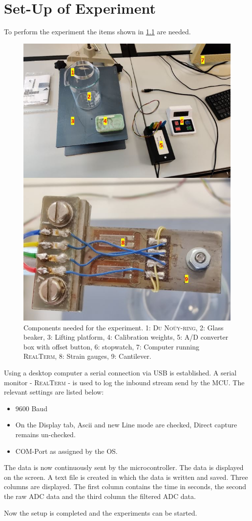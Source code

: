 \chapter{Set-Up of Experiment}
To perform the experiment the items shown in \cref{fig:setup} are needed.
 \begin{figure}[H]
	\centering
	\includegraphics[width=.7\textwidth]{aufbau/Setup/setup_num}
	\caption[Components needed for the experiment]{Components needed for the experiment. 1: \textsc{Du Noüy-ring}, 2: Glass beaker, 3: Lifting platform, 4: Calibration weights, 5: A/D converter box with offset button, 6: stopwatch, 7: Computer running \textsc{RealTerm}, 8: Strain gauges, 9: Cantilever.}
	\label{fig:setup}
\end{figure}

Using a desktop computer a serial connection via USB is established. A serial monitor - \textsc{RealTerm} - is used to log the inbound stream send by the MCU. The relevant settings are listed below:
\begin{itemize}
	\item 9600 Baud
	\item On the Display tab, Ascii and new Line mode are checked, Direct capture remains
	un-checked.
	\item COM-Port as assigned by the OS.
\end{itemize}
The data is now continuously sent by the microcontroller. The data is displayed on the screen. A text file is created in which the data is written and saved. Three columns are displayed. The first column contains the time in seconds, the second the raw ADC data and the third column the filtered ADC data.\par
Now the setup is completed and the experiments can be started.
